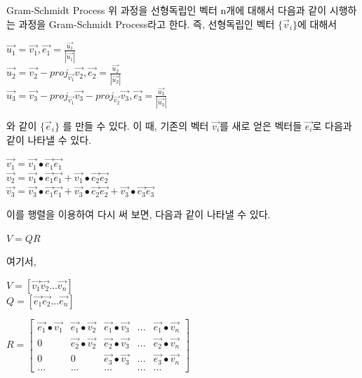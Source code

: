 \documentclass{beamer}
\begin{document}
\begin{frame}[allowframebreaks]{Gram-Schmidt Process}
위 과정을 선형독립인 벡터 n개에 대해서 다음과 같이 시행하는 과정을 Gram-Schmidt Process라고 한다. 즉, 선형독립인 벡터 $\{\vec{v}_i\}$에 대해서

$\vec{u_1} = \vec{v_1},  \vec{e_1} = \frac{\vec{u_1}}{|\vec{u_1}|}$\\
$\vec{u_2} = \vec{v_2} - proj_{\vec{v_1}}\vec{v_2},  \vec{e_2} = \frac{\vec{u_2}}{|\vec{u_2}|} $ \\ 
$\vec{u_3} = \vec{v_3} - proj_{\vec{v_1}}\vec{v_3}- proj_{\vec{v_2}}\vec{v_3},  \vec{e_3} = \frac{\vec{u_3}}{|\vec{u_3}|}$ 

와 같이 $\{\vec{e}_i\}$ 를 만들 수 있다. 이 때, 기존의 벡터 $\vec{v_i}$를 새로 얻은 벡터들 $\vec{e_i}$로 다음과 같이 나타낼 수 있다. 

\begin{centering}

$\vec{v_1} = \vec{v_1} \bullet \vec{e_1} \vec{e_1}$ \\ 
$\vec{v_2} = \vec{v_1} \bullet \vec{e_1} \vec{e_1} + \vec{v_1} \bullet \vec{e_2} \vec{e_2}$ \\ 
$\vec{v_3} = \vec{v_3} \bullet \vec{e_1} \vec{e_1} + \vec{v_3} \bullet \vec{e_2} \vec{e_2} + \vec{v_3} \bullet \vec{e_3} \vec{e_3}$ 

\end{centering}

이를 행렬을 이용하여 다시 써 보면, 다음과 같이 나타낼 수 있다. 

\framebreak

$V = QR$

여기서, 
\vspace{5mm}

$V = \left[ \vec{v_1} \vec{v_2} ... \vec{v_n}  \right]$ \\ 
$Q = \left[ \vec{e_1} \vec{e_2} ... \vec{e_n} \right]$ 

$R = \left[ \begin{matrix} 
\vec{e_1}\bullet \vec{v_1} & \vec{e_1}\bullet \vec{v_2} & \vec{e_1}\bullet\vec{v_3}& ... & \vec{e_1}\bullet \vec{v_n}  \\ 
0 & \vec{e_2}\bullet\vec{v_2} & \vec{e_2}\bullet\vec{v_3} & ... & \vec{e_2}\bullet \vec{v_n} \\
0 & 0 & \vec{e_3}\bullet\vec{v_3} & ... & \vec{e_3}\bullet \vec{v_n} \\
...&...&...&...&... 
\end{matrix} \right]$

\end{frame}
\end{document}
